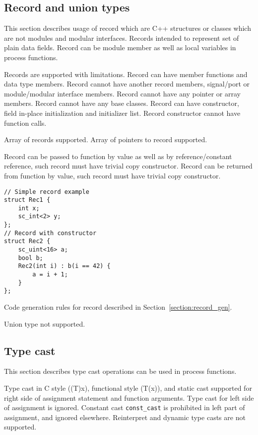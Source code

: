 \subsection{Record and union types}

This section describes usage of record which are C++ structures or classes which are not modules and modular interfaces. Records intended to represent set of plain data fields. Record can be module member as well as local variables in process functions. 

Records are supported with limitations. Record can have member functions and data type members. Record cannot have another record members, signal/port or module/modular interface members. Record cannot have any pointer or array members. Record cannot have any base classes.
Record can have constructor, field in-place initialization and initializer list. Record constructor cannot have function calls.

Array of records supported. Array of pointers to record supported.

Record can be passed to function by value as well as by reference/constant reference, such record must have trivial copy constructor. Record can be returned from function by value, such record must have trivial copy constructor.
%
\begin{lstlisting}[style=mycpp]
// Simple record example
struct Rec1 {
    int x;
    sc_int<2> y;
};
// Record with constructor
struct Rec2 {
    sc_uint<16> a;       
    bool b;
    Rec2(int i) : b(i == 42) {
        a = i + 1;
    }
};
\end{lstlisting}

Code generation rules for record described in Section~\ref{section:record_gen}. 

Union type not supported.

\subsection{Type cast}

This section describes type cast operations can be used in process functions. 

Type cast in C style ((T)x), functional style (T(x)), and static cast supported for right side of assignment statement and function arguments. Type cast for left side of assignment is ignored. 
Constant cast {\tt const\_cast} is prohibited in left part of assignment, and ignored elsewhere. Reinterpret and dynamic type casts are not supported.


